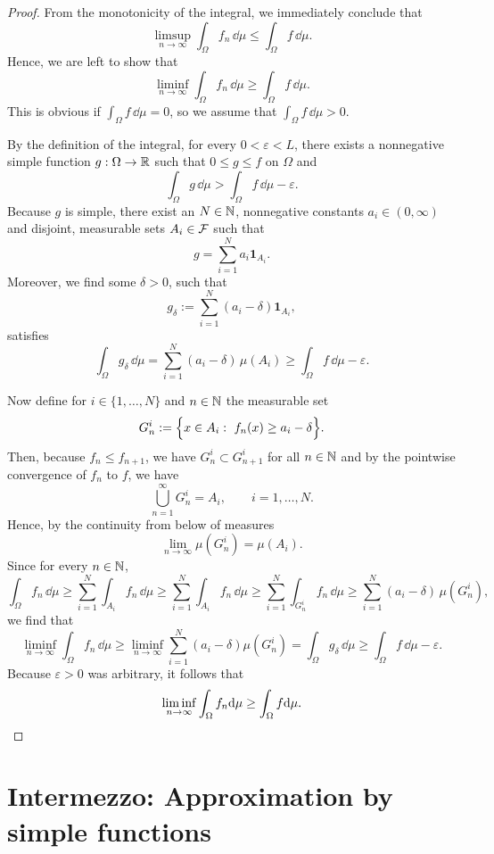 \begin{proof}
	From the monotonicity of the integral, we immediately conclude that
	\[
	\limsup_{n \to \infty} \int_\Omega f_n\, \dd \mu \leq \int_\Omega f\, \dd \mu.
	\]
	Hence, we are left to show that
	\[
	\liminf_{n \to \infty } \int_\Omega f_n\, \dd \mu \geq \int_\Omega f\, \dd \mu.
	\]
	This is obvious if $\int_\Omega f\, \dd \mu = 0$, so we assume that $\int_\Omega f\, \dd \mu >0$.
	
	By the definition of the integral, for every $0<\varepsilon<L$, there exists a nonnegative simple function $g: \Omega \to \mathbb R$ such that $0\le g \leq f$ on $\Omega$ and
	\[
		\int_\Omega g\, \dd \mu > \int_\Omega f\, \dd \mu - \varepsilon.
	\]
	Because $g$ is simple, there exist an $N \in \mathbb N$, nonnegative constants $a_i \in (0,\infty)$ and disjoint, measurable sets $A_i \in \mathcal F$ such that
	\[
		g = \sum_{i=1}^N a_i \mathbf{1}_{A_i}.
	\]
	Moreover, we find some $\delta>0$, such that
	\[
		g_\delta:= \sum_{i=1}^N (a_i-\delta)\mathbf{1}_{A_i}, 
	\]
	satisfies
	\[
		\int_\Omega g_\delta\,\dd \mu = \sum_{i=1}^N(a_i-\delta)\,\mu(A_i) \ge \int_\Omega f\,\dd\mu - \varepsilon. 
	\]
	
	Now define for $i \in \{ 1, \dots, N\}$ and $n \in \mathbb N$ the measurable set
	\[
	G_n^i := \Bigl\{ x \in A_i : \ f_n(x) \geq a_i - \delta \Bigr\}.
	\]
	Then, because $f_n \leq f_{n+1}$, we have $G_n^i \subset G_{n+1}^i$ for all $n \in \mathbb N$ and by the pointwise convergence of $f_n$ to $f$, we have
	\[
	\bigcup_{n=1}^\infty G_n^i = A_i,\qquad i=1,\ldots,N.
	\]
	Hence, by the continuity from below of measures
	\[
		\lim_{n \to \infty}\mu(G_n^i) = \mu(A_i).
	\]
	Since for every $n\in\mathbb N$,
		\[
		\int_\Omega f_n\,\dd\mu \ge \sum_{i=1}^N \int_{A_i} f_n\,\dd \mu \ge \sum_{i=1}^N \int_{A_i} f_n\,\dd \mu \ge \sum_{i=1}^N \int_{G_n^i} f_n\,\dd \mu \ge \sum_{i=1}^N (a_i-\delta)\,\mu(G_n^i),
	\]
	we find that
	\[
		\liminf_{n \to \infty} \int_\Omega f_n\, \dd \mu \ge  \liminf_{n \to \infty } \sum_{i=1}^N (a_i - \delta) \mu(G_n^i) = \int_\Omega g_\delta\,\dd\mu \ge \int_\Omega f\,\dd\mu - \varepsilon. 
	\]
	Because $\varepsilon>0$ was arbitrary, it follows that
	\[
	\liminf_{n \to \infty} \int_\Omega f_n \mathrm{d} \mu \geq \int_\Omega f \mathrm{d} \mu.\qedhere
	\]	
\end{proof}

\section{Intermezzo: Approximation by simple functions}
\label{sec:simple-approximation}

